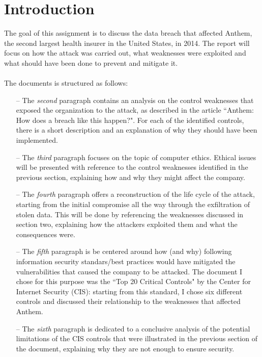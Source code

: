 	\section{Introduction}
	The goal of this assignment is to discuss the data breach that affected Anthem, the second largest health insurer in the United States, in 2014. The report will focus on how the attack was carried out, what weaknesses were exploited and what should have been done to prevent and mitigate it.\\\\The documents is structured as follows:
	\begin{itemize}
		\item[--] The \textit{second} paragraph contains an analysis on the control weaknesses that exposed the organization to the attack, as described in the article ``Anthem: How does a breach like this happen?"\cite{breacharticle}. For each of the identified controls, there is a short description and an explanation of why they should have been implemented.
		\item[--] The \textit{third} paragraph focuses on the topic of computer ethics. Ethical issues will be presented with reference to the control weaknesses identified in the previous section, explaining how and why they might affect the company.
		\item[--] The \textit{fourth} paragraph offers a reconstruction of the life cycle of the attack, starting from the initial compromise all the way through the exfiltration of stolen data. This will be done by referencing the weaknesses discussed in section two, explaining how the attackers exploited them and what the consequences were.
		\item[--] The \textit{fifth} paragraph is be centered around how (and why) following information security standars/best practices would have mitigated the vulnerabilities that caused the company to be attacked. The document I chose for this purpose was the ``Top 20 Critical Controls" by the Center for Internet Security (CIS): starting from this standard, I chose six different controls and discussed their relationship to the weaknesses that affected Anthem.
		\item[--] The \textit{sixth} paragraph is dedicated to a conclusive analysis of the potential limitations of the CIS controls that were illustrated in the previous section of the document, explaining why they are not enough to ensure security.
	\end{itemize}
